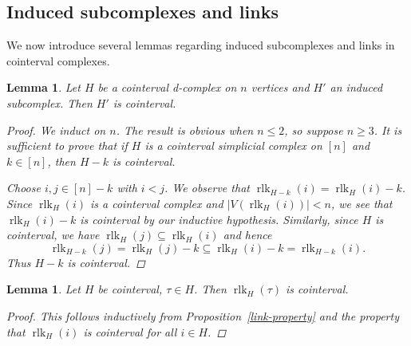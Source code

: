 \documentclass[11pt]{amsart}
\newtheorem{lemma}[theorem]{Lemma}
\theoremstyle{definition}
\numberwithin{equation}{section}
\theoremstyle{remark}
\numberwithin{equation}{section}
\begin{document}
\subsection{Induced subcomplexes and links}

We now introduce several lemmas regarding induced subcomplexes and links in cointerval complexes.

\begin{lemma} \label{induced-cointerval} Let $H$ be a cointerval d-complex on $n$ vertices and $H'$ an induced subcomplex. Then $H'$ is cointerval.

\begin{proof}

We induct on $n$.  The result is obvious when $n \leq 2$, so suppose $n \geq 3$.  It is sufficient to prove that if $H$ is a cointerval simplicial complex on $[n]$ and $k \in [n]$, then $H-k$ is cointerval. 

Choose $i,j \in [n]-k$ with $i<j$.  We observe that $\operatorname{rlk}_{H-k}(i) = \operatorname{rlk}_H(i)-k$.  Since $\operatorname{rlk}_H(i)$ is a cointerval complex and $|V(\operatorname{rlk}_H(i))| < n$, we see that $\operatorname{rlk}_H(i)-k$ is cointerval by our inductive hypothesis.  Similarly, since $H$ is cointerval, we have $\operatorname{rlk}_H(j) \subseteq \operatorname{rlk}_H(i)$ and hence $$\operatorname{rlk}_{H-k}(j) = \operatorname{rlk}_H(j)-k \subseteq \operatorname{rlk}_H(i)-k = \operatorname{rlk}_{H-k}(i).$$  Thus $H-k$ is cointerval.

\end{proof}

\end{lemma}

\begin{lemma} \label{rlk-cointerval} 
Let $H$ be cointerval, $\tau \in H$. Then $\operatorname{rlk}_H(\tau)$ is cointerval.

\begin{proof} 
This follows inductively from Proposition~\ref{link-property} and the property that $\operatorname{rlk}_{H}(i)$ is cointerval for all $i \in H$.
\end{proof}

\end{lemma}
\end{document}
